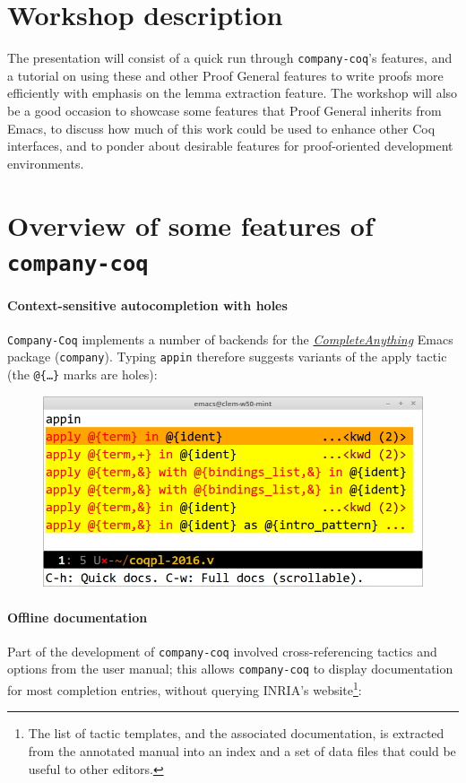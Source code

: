 \documentclass[preprint]{sigplanconf}
\newcommand{\proofg}{Proof General\xspace}
\begin{document}
\section*{Workshop description}

The presentation will consist of a quick run through \texttt{company-coq}'s features, and a tutorial on using these and other \proofg features to write proofs more efficiently with emphasis on the lemma extraction feature. The workshop will also be a good occasion to showcase some features that \proofg inherits from Emacs, to discuss how much of this work could be used to enhance other Coq interfaces, and to ponder about desirable features for proof-oriented development environments.

\section*{Overview of some features of \texttt{company-coq}}

\paragraph{Context-sensitive autocompletion with holes} \texttt{Company-Coq} implements a number of backends for the \href{https://company-mode.github.io/}{\emph{CompleteAnything}} Emacs package (\texttt{company}). Typing \texttt{app{\kern0.5pt}in} therefore suggests variants of the apply tactic (the \texttt{@\{\ldots\}} marks are holes):

\begin{figure}[H]
  \centering
  \includegraphics[width=\linewidth]{apply-in-xxl-2.png}
\end{figure}

\paragraph{Offline documentation} Part of the development of
\texttt{company-coq} involved cross-referencing tactics and options
from the user manual; this allows \texttt{company-coq} to display
documentation for most completion entries, without querying INRIA's
website\footnote{The list of tactic templates, and the associated
  documentation, is extracted from the annotated manual into an index and a set of data files that could be useful to other editors.}:
\end{document}
